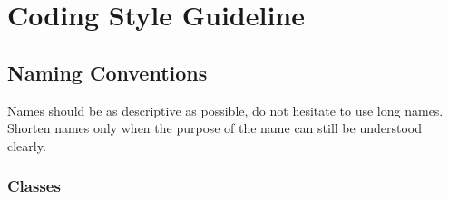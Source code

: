 

\clearpage
\appendix

\chapter{Coding Style Guideline}


\section{Naming Conventions}

Names should be as descriptive as possible, do not hesitate to use
long names.  Shorten names only when the purpose of the name can still
be understood clearly.


\subsection{Classes}

